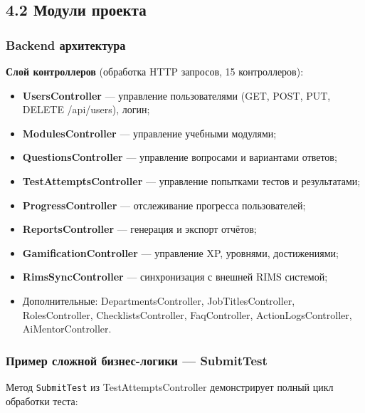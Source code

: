 \subsection{4.2 Модули проекта}

\subsubsection{Backend архитектура}

\textbf{Слой контроллеров} (обработка HTTP запросов, 15 контроллеров):

\begin{itemize}
    \item \textbf{UsersController} --- управление пользователями (GET, POST, PUT, DELETE /api/users), логин;
    \item \textbf{ModulesController} --- управление учебными модулями;
    \item \textbf{QuestionsController} --- управление вопросами и вариантами ответов;
    \item \textbf{TestAttemptsController} --- управление попытками тестов и результатами;
    \item \textbf{ProgressController} --- отслеживание прогресса пользователей;
    \item \textbf{ReportsController} --- генерация и экспорт отчётов;
    \item \textbf{GamificationController} --- управление XP, уровнями, достижениями;
    \item \textbf{RimsSyncController} --- синхронизация с внешней RIMS системой;
    \item Дополнительные: DepartmentsController, JobTitlesController, RolesController, ChecklistsController, FaqController, ActionLogsController, AiMentorController.
\end{itemize}

\subsubsection{Пример сложной бизнес-логики --- SubmitTest}

Метод \texttt{SubmitTest} из TestAttemptsController демонстрирует полный цикл обработки теста:

